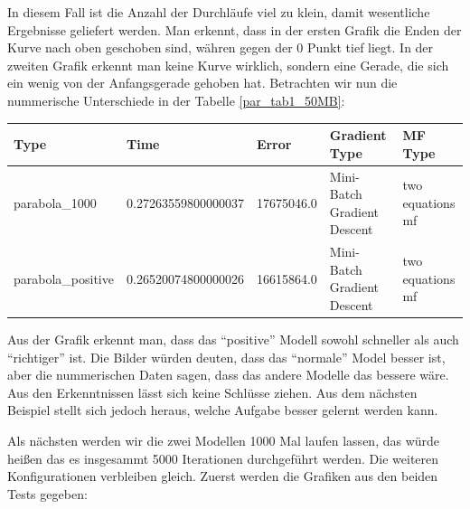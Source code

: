 In diesem Fall ist die Anzahl der Durchläufe viel zu klein, damit wesentliche Ergebnisse geliefert werden. Man erkennt, dass in der ersten Grafik die Enden der Kurve nach oben geschoben sind, währen gegen der 0 Punkt tief liegt. In der zweiten Grafik erkennt man keine Kurve wirklich, sondern eine Gerade, die sich ein wenig von der Anfangsgerade gehoben hat. Betrachten wir nun die nummerische Unterschiede in der Tabelle \ref{par_tab1_50MB}:

\begin{center}\label{par_tab1_50MB}
	\begin{tabular}{ | p{3.1cm} | l | l | p{3cm} | p{3cm} |}
		\hline
		Type & Time & Error & Gradient Type & MF Type \\ \hline
		parabola\_1000 & 0.27263559800000037 & 17675046.0 & Mini-Batch Gradient Descent & two equations mf
		 \\ \hline
		parabola\_positive & 0.26520074800000026 & 16615864.0 & Mini-Batch Gradient Descent & two equations mf
		 \\ \hline
	\end{tabular}
\end{center} 

Aus der Grafik erkennt man, dass das ``positive'' Modell sowohl schneller als auch ``richtiger'' ist. Die Bilder würden deuten, dass das ``normale'' Model besser ist, aber die nummerischen Daten sagen, dass das andere Modelle das bessere wäre. Aus den Erkenntnissen lässt sich keine Schlüsse ziehen. Aus dem nächsten Beispiel stellt sich jedoch heraus, welche Aufgabe besser gelernt werden kann.

Als nächsten werden wir die zwei Modellen 1000 Mal laufen lassen, das würde heißen das es insgesammt 5000 Iterationen durchgeführt werden. Die weiteren Konfigurationen verbleiben gleich. Zuerst werden die Grafiken aus den beiden Tests gegeben:

